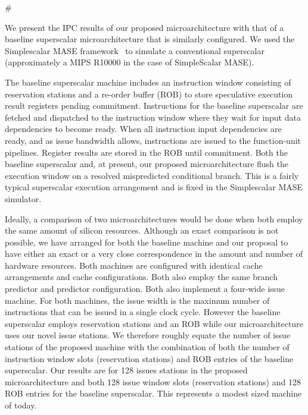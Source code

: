 #\documentclass[10pt,dvips]{article}
\begin{document}
We present the IPC results of our proposed
microarchitecture with that of a baseline 
superscalar microarchitecture that is similarly configured.
We used the 
Simplescalar MASE framework~\cite{Austin97}
to simulate a conventional superscalar (approximately a MIPS R10000
in the case of SimpleScalar MASE).

The baseline superscalar machine includes an instruction
window consisting of reservation stations and a re-order buffer (ROB)
to store speculative execution result registers pending commitment.
Instructions for the baseline superscalar are fetched and dispatched
to the instruction window where they wait for input data dependencies to
become ready.  When all instruction input dependencies are ready,
and as issue bandwidth allows, instructions are issued to the
function-unit pipelines.  Register results are stored in the ROB
until commitment.  
Both the baseline superscalar and, at present, our proposed
microarchitecture flush the execution window on a resolved mispredicted 
conditional branch.
This is a fairly typical superscalar execution
arrangement and is fixed in the Simplescalar MASE simulator.

Ideally, a comparison of two microarchitectures would be
done when both employ the same amount of silicon resources.
Although an exact comparison is not possible, we have arranged
for both the baseline machine and our proposal to have either an
exact or a very
close correspondence in the amount and number of hardware resources.
Both machines are configured with identical
cache arrangements and cache configurations.
Both also employ the same branch predictor and predictor configuration.
Both also implement a four-wide issue machine.
For both machines, the issue width is the maximum number of
instructions that can be issued in a single clock cycle.
However the baseline superscalar employs reservation stations and
an ROB while our microarchitecture uses our novel issue stations.
We therefore roughly equate the number of issue stations of
the proposed machine with the combination of both the
number of instruction window slots (reservation stations)
and ROB entries of the baseline superscalar.
Our results are for 128 issues stations in the proposed 
microarchitecture and both 128 issue window slots (reservation stations)
and 128 ROB entries for the baseline superscalar.
This represents a modest sized machine of today.
\end{document}
